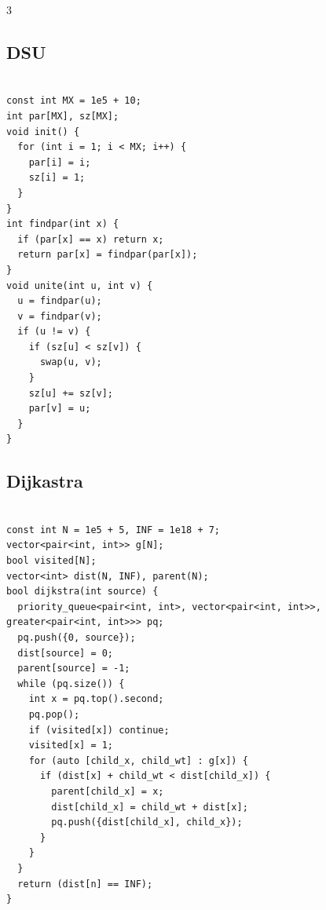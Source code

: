 \documentclass[10pt, landscape, a4paper, onesided]{extarticle}
\begin{document}
\begin{multicols*}{3}
\subsection{DSU}
\begin{verbatim}

const int MX = 1e5 + 10;
int par[MX], sz[MX];
void init() {
  for (int i = 1; i < MX; i++) {
    par[i] = i;
    sz[i] = 1;
  }
}
int findpar(int x) {
  if (par[x] == x) return x;
  return par[x] = findpar(par[x]);
}
void unite(int u, int v) {
  u = findpar(u);
  v = findpar(v);
  if (u != v) {
    if (sz[u] < sz[v]) {
      swap(u, v);
    }
    sz[u] += sz[v];
    par[v] = u;
  }
}
\end{verbatim}

\subsection{Dijkastra}
\begin{verbatim}

const int N = 1e5 + 5, INF = 1e18 + 7;
vector<pair<int, int>> g[N];
bool visited[N];
vector<int> dist(N, INF), parent(N);
bool dijkstra(int source) {
  priority_queue<pair<int, int>, vector<pair<int, int>>, greater<pair<int, int>>> pq;
  pq.push({0, source});
  dist[source] = 0;
  parent[source] = -1;
  while (pq.size()) {
    int x = pq.top().second;
    pq.pop();
    if (visited[x]) continue;
    visited[x] = 1;
    for (auto [child_x, child_wt] : g[x]) {
      if (dist[x] + child_wt < dist[child_x]) {
        parent[child_x] = x;
        dist[child_x] = child_wt + dist[x];
        pq.push({dist[child_x], child_x});
      }
    }
  }
  return (dist[n] == INF);
}
\end{verbatim}


\end{multicols*}
\end{document}
